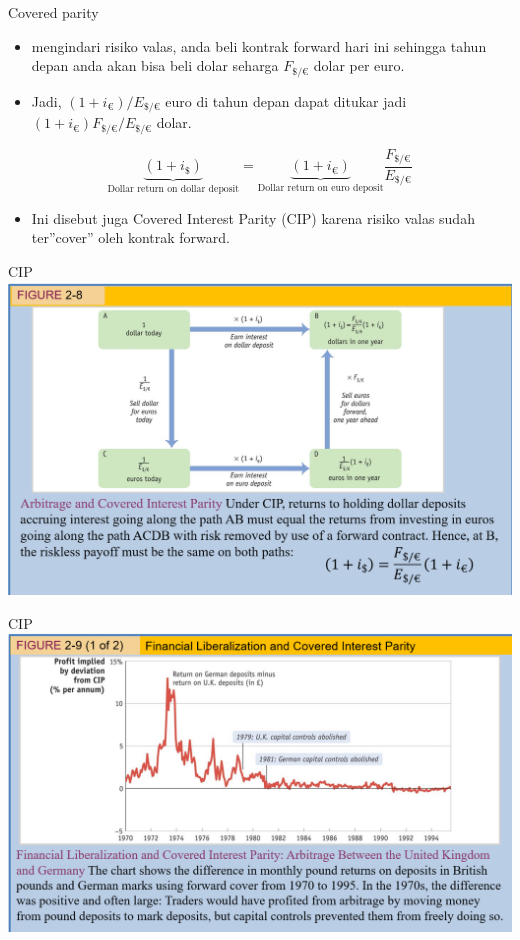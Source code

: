 \documentclass[
  ignorenonframetext,
]{beamer}
\providecommand{\tightlist}{%
  \setlength{\itemsep}{0pt}\setlength{\parskip}{0pt}}\usepackage{longtable,booktabs,array}
\begin{document}
\begin{frame}{Covered parity}
\label{covered-parity-1}
\begin{itemize}
\item
  mengindari risiko valas, anda beli kontrak forward hari ini sehingga
  tahun depan anda akan bisa beli dolar seharga \(F_{\$/€}\) dolar per
  euro.
\item
  Jadi, \((1+i_{€})/E_{\$/€}\) euro di tahun depan dapat ditukar jadi
  \((1+i_{€})F_{\$/€}/E_{\$/€}\) dolar.
\end{itemize}

\[
\underbrace{(1+i_{\$})}_\text{Dollar return on dollar deposit}=\underbrace{(1+i_{€})}_\text{Dollar return on euro deposit}\frac{F_{\$/€}}{E_{\$/€}}
\]

\begin{itemize}
\tightlist
\item
  Ini disebut juga Covered Interest Parity (CIP) karena risiko valas
  sudah ter''cover'' oleh kontrak forward.
\end{itemize}
\end{frame}

\begin{frame}{CIP}
\label{cip}
\includegraphics{pic1.png}
\end{frame}

\begin{frame}{CIP}
\label{cip-1}
\includegraphics{pic2.png}
\end{frame}
\end{document}
